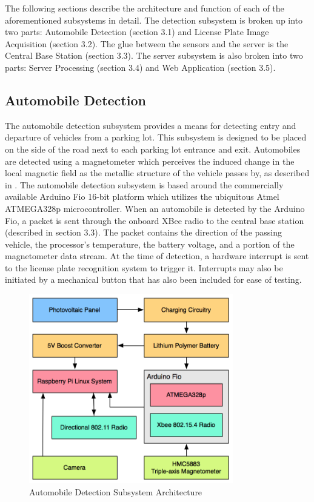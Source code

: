 \documentclass[11pt, oneside, fullpage, doublespace]{article}
\begin{document}
The following sections describe the architecture and function of each of the aforementioned subsystems in detail. The detection subsystem is broken up into two parts: Automobile Detection (section 3.1) and License Plate Image Acquisition (section 3.2). The glue between the sensors and the server is the Central Base Station (section 3.3). The server subsystem is also broken into two parts: Server Processing (section 3.4) and Web Application (section 3.5).

\subsection{Automobile Detection}
The automobile detection subsystem provides a means for detecting entry and departure of vehicles from a parking lot. This subsystem is designed to be placed on the side of the road next to each parking lot entrance and exit. Automobiles are detected using a magnetometer which perceives the induced change in the local magnetic field as the metallic structure of the vehicle passes by, as described in \cite{stillwell2013}. The automobile detection subsystem is based around the commercially available Arduino Fio 16-bit platform which utilizes the ubiquitous Atmel ATMEGA328p microcontroller. When an automobile is detected by the Arduino Fio, a packet is sent through the onboard XBee radio to the central base station (described in section 3.3). The packet  contains the direction of the passing vehicle, the processor's temperature, the battery voltage, and a portion of the magnetometer data stream. At the time of detection, a hardware interrupt is sent to the license plate recognition system to trigger it. Interrupts may also be initiated by a mechanical button that has also been included for ease of testing.

\begin{figure}
\begin{center}
\includegraphics[width=3.5in]{autodetection}
\end{center}
\caption{Automobile Detection Subsystem Architecture}
\label{fig:autodetect}
\end{figure}
\end{document}

